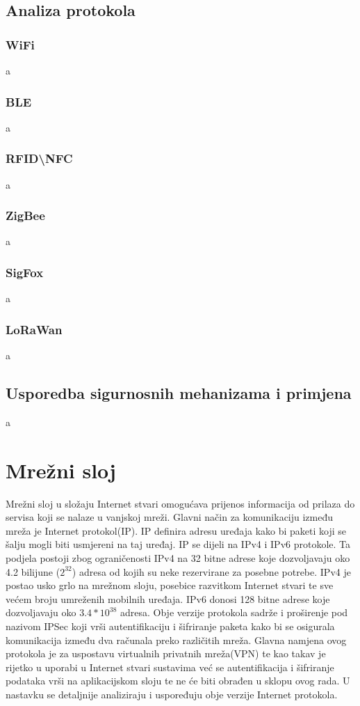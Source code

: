 \documentclass[times, utf8, diplomski]{fer}
\begin{document}
\subsection{Analiza protokola}
\subsubsection{WiFi}
a

\subsubsection{BLE}
a

\subsubsection{RFID\textbackslash NFC}
a

\subsubsection{ZigBee}
a

\subsubsection{SigFox}
a

\subsubsection{LoRaWan}
a

\subsection{Usporedba sigurnosnih mehanizama i primjena}
a

\section{Mrežni sloj}
Mrežni sloj u složaju Internet stvari omogućava prijenos informacija od prilaza do servisa koji se nalaze u vanjskoj mreži. Glavni način za komunikaciju između mreža je Internet protokol(IP). IP definira adresu uređaja kako bi paketi koji se šalju mogli biti usmjereni na taj uređaj. IP se dijeli na IPv4 i IPv6 protokole. Ta podjela postoji zbog ograničenosti IPv4 na 32 bitne adrese koje dozvoljavaju oko 4.2 bilijune ($2^{32}$) adresa od kojih su neke rezervirane za posebne potrebe. IPv4 je postao usko grlo na mrežnom sloju, posebice razvitkom Internet stvari te sve većem broju umreženih mobilnih uređaja. IPv6 donosi 128 bitne adrese koje dozvoljavaju oko $3.4*10^{38}$ adresa. Obje verzije protokola sadrže i proširenje pod nazivom IPSec  koji vrši autentifikaciju i šifriranje paketa kako bi se osigurala komunikacija između dva računala preko različitih mreža. Glavna namjena ovog protokola je za uspostavu virtualnih privatnih mreža(VPN) te kao takav je rijetko u uporabi u Internet stvari sustavima već se autentifikacija i šifriranje podataka vrši na aplikacijskom sloju te ne će biti obrađen u sklopu ovog rada. U nastavku se detaljnije analiziraju i uspoređuju obje verzije Internet protokola.
\end{document}
